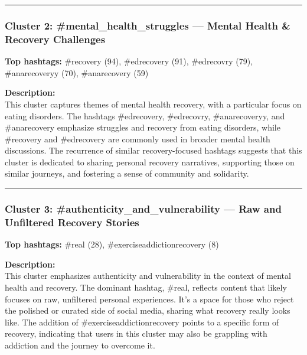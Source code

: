 \documentclass[
]{article}
\begin{document}
\begin{center}\rule{0.5\linewidth}{0.5pt}\end{center}

\subsubsection{Cluster 2: \#mental\_health\_struggles --- Mental Health
\& Recovery
Challenges}\label{cluster-2-mental_health_struggles-mental-health-recovery-challenges}

\textbf{Top hashtags:} \#recovery (94), \#edrecovery (91), \#edrecovry
(79), \#anarecoveryy (70), \#anarecovery (59)

\textbf{Description:}\\

This cluster captures themes of mental health recovery, with a
particular focus on eating disorders. The hashtags \#edrecovery,
\#edrecovry, \#anarecoveryy, and \#anarecovery emphasize struggles and
recovery from eating disorders, while \#recovery and \#edrecovery are
commonly used in broader mental health discussions. The recurrence of
similar recovery-focused hashtags suggests that this cluster is
dedicated to sharing personal recovery narratives, supporting those on
similar journeys, and fostering a sense of community and solidarity.

\begin{center}\rule{0.5\linewidth}{0.5pt}\end{center}

\subsubsection{Cluster 3: \#authenticity\_and\_vulnerability --- Raw and
Unfiltered Recovery
Stories}\label{cluster-3-authenticity_and_vulnerability-raw-and-unfiltered-recovery-stories}

\textbf{Top hashtags:} \#real (28), \#exerciseaddictionrecovery (8)

\textbf{Description:}\\

This cluster emphasizes authenticity and vulnerability in the context of
mental health and recovery. The dominant hashtag, \#real, reflects
content that likely focuses on raw, unfiltered personal experiences.
It's a space for those who reject the polished or curated side of social
media, sharing what recovery really looks like. The addition of
\#exerciseaddictionrecovery points to a specific form of recovery,
indicating that users in this cluster may also be grappling with
addiction and the journey to overcome it.
\end{document}

